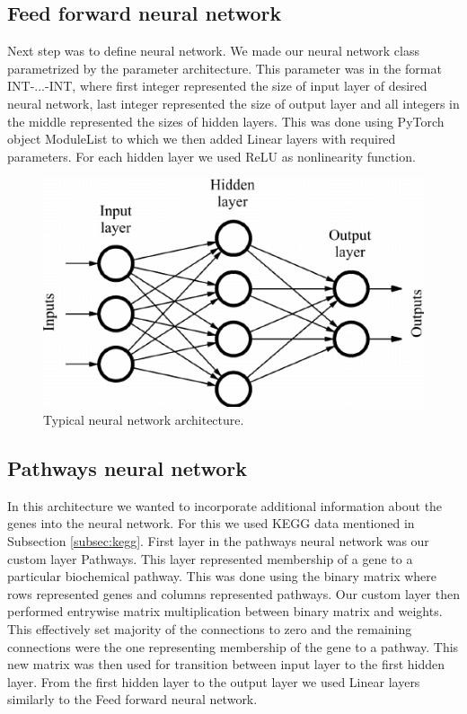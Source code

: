 \subsection{Feed forward neural network}
Next step was to define neural network.
We made our neural network class parametrized by the parameter architecture.
This parameter was in the format INT-...-INT, where first integer represented the size of input layer of desired neural network, last integer represented the size of output layer and all integers in the middle represented the sizes of hidden layers.
This was done using PyTorch object ModuleList to which we then added Linear layers with required parameters.
For each hidden layer we used ReLU as nonlinearity function.

\begin{figure}
    \centering
    \includegraphics[width=0.8\linewidth]{images/ff_nn.png}
    \caption{Typical neural network architecture.}
    \label{fig:ff_nn}
\end{figure}

\subsection{Pathways neural network}
In this architecture we wanted to incorporate additional information about the genes into the neural network.
For this we used KEGG data mentioned in Subsection \ref{subsec:kegg}.
First layer in the pathways neural network was our custom layer Pathways.
This layer represented membership of a gene to a particular biochemical pathway.
This was done using the binary matrix where rows represented genes and columns represented pathways.
Our custom layer then performed entrywise matrix multiplication between binary matrix and weights.
This effectively set majority of the connections to zero and the remaining connections were the one representing membership of the gene to a pathway.
This new matrix was then used for transition between input layer to the first hidden layer.
From the first hidden layer to the output layer we used Linear layers similarly to the Feed forward neural network.

